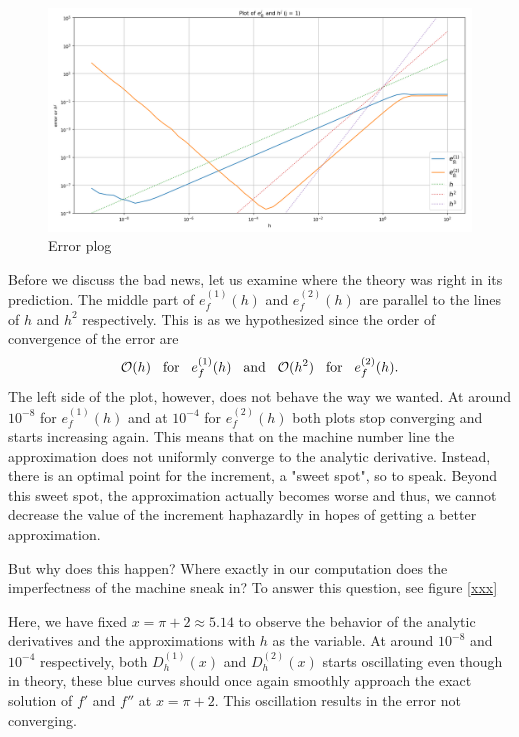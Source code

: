 \begin{figure}[h!]
    \includegraphics[width=\linewidth]{graphics/error_plot/exp1_error_plot.png}
    \caption{Error plog}
    \label{fig:exp1_error_plot}
\end{figure}

Before we discuss the bad news, let us examine where the theory was right in its prediction. The middle part of \(e_f^{(1)}(h)\) and \(e_f^{(2)}(h)\) are parallel to the lines of \(h\) and \(h^2\) respectively. This is as we hypothesized since the order of convergence of the error are
\[\mathcal{O}(h) \hspace{0.3cm} \text{for} \hspace{0.3cm} e_f^{(1)}(h) \hspace{0.3cm} \text{and} \hspace{0.3cm} \mathcal{O}(h^2) \hspace{0.3cm} \text{for} \hspace{0.3cm} e_f^{(2)}(h) \text{.}\]
The left side of the plot, however, does not behave the way we wanted. At around \(10^{-8}\) for \(e_f^{(1)}(h)\) and at \(10^{-4}\) for \(e_f^{(2)}(h)\) both plots stop converging and starts increasing again. This means that on the machine number line the approximation does not uniformly converge to the analytic derivative. Instead, there is an optimal point for the increment, a "sweet spot", so to speak. Beyond this sweet spot, the approximation actually becomes worse and thus, we cannot decrease the value of the increment haphazardly in hopes of getting a better approximation.

But why does this happen? Where exactly in our computation does the imperfectness of the machine sneak in? To answer this question, see figure \ref{xxx}


Here, we have fixed \(x = \pi + 2 \approx 5.14\) to observe the behavior of the analytic derivatives and the approximations with \(h\) as the variable. At around \(10^{-8}\) and \(10^{-4}\) respectively, both \(D^{(1)}_h(x)\) and \(D^{(2)}_h(x)\) starts oscillating even though in theory, these blue curves should once again smoothly approach the exact solution of \(f'\) and \(f''\) at \(x = \pi + 2\). This oscillation results in the error not converging.

